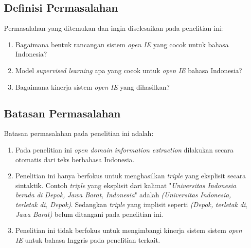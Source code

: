 \subsection{Definisi Permasalahan}

Permasalahan yang ditemukan dan ingin diselesaikan pada penelitian ini:

\begin{enumerate}
\item Bagaimana bentuk rancangan sistem \textit{open IE} yang cocok untuk bahasa Indonesia?
\item Model \textit{supervised learning} apa yang cocok untuk \textit{open IE} bahasa Indonesia?
\item Bagaimana kinerja sistem \textit{open IE} yang dihasilkan?
\end{enumerate}

\subsection{Batasan Permasalahan}

Batasan permasalahan pada penelitian ini adalah:

\begin{enumerate}
	\item Pada penelitian ini \textit{open domain information extraction} dilakukan secara otomatis dari teks berbahasa Indonesia.
	
	\item Penelitian ini hanya berfokus untuk menghasilkan \textit{triple} yang eksplisit secara sintaktik. Contoh \textit{triple} yang eksplisit dari kalimat "\textit{Universitas Indonesia berada di Depok, Jawa Barat, Indonesia}" adalah \textit{(Universitas Indonesia, terletak di, Depok)}. Sedangkan \textit{triple} yang implisit seperti \textit{(Depok, terletak di, Jawa Barat)} belum ditangani pada penelitian ini.
	
	\item Penelitian ini tidak berfokus untuk mengimbangi kinerja sistem sistem \textit{open IE} untuk bahasa Inggris pada penelitian terkait.

\end{enumerate}

